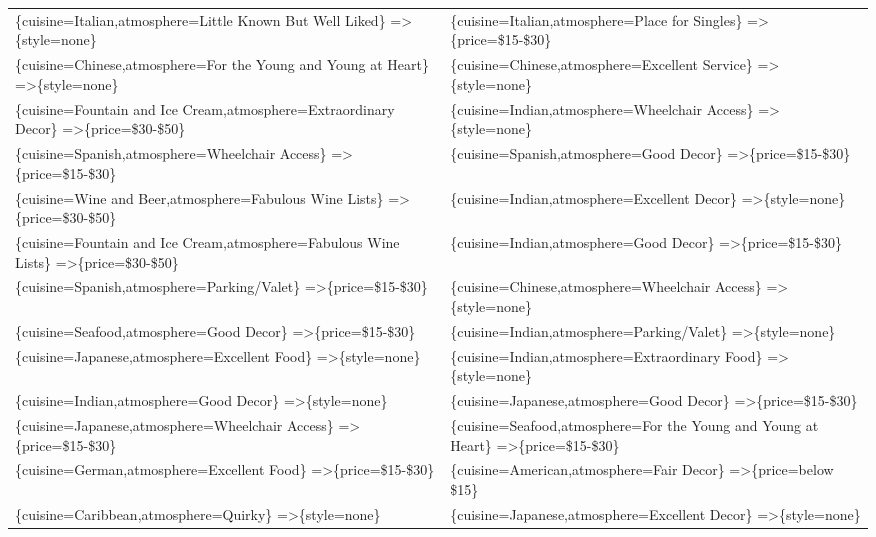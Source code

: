 \documentclass[letterpaper,10pt]{article}
\begin{document}
\begin{appendices}
\begin{table}[h]
\begin{adjustbox}{max width=\textwidth}
\begin{tabular}{ll}
\{cuisine=Italian,atmosphere=Little Known But Well Liked\} =\textgreater \{style=none\} & \{cuisine=Italian,atmosphere=Place for Singles\} =\textgreater \{price=\$15-\$30\} \\
\{cuisine=Chinese,atmosphere=For the Young and Young at Heart\} =\textgreater \{style=none\} & \{cuisine=Chinese,atmosphere=Excellent Service\} =\textgreater \{style=none\} \\
\{cuisine=Fountain and Ice Cream,atmosphere=Extraordinary Decor\} =\textgreater \{price=\$30-\$50\} & \{cuisine=Indian,atmosphere=Wheelchair Access\} =\textgreater \{style=none\} \\
\{cuisine=Spanish,atmosphere=Wheelchair Access\} =\textgreater \{price=\$15-\$30\} & \{cuisine=Spanish,atmosphere=Good Decor\} =\textgreater \{price=\$15-\$30\} \\
\{cuisine=Wine and Beer,atmosphere=Fabulous Wine Lists\} =\textgreater \{price=\$30-\$50\} & \{cuisine=Indian,atmosphere=Excellent Decor\} =\textgreater \{style=none\} \\
\{cuisine=Fountain and Ice Cream,atmosphere=Fabulous Wine Lists\} =\textgreater \{price=\$30-\$50\} & \{cuisine=Indian,atmosphere=Good Decor\} =\textgreater \{price=\$15-\$30\} \\
\{cuisine=Spanish,atmosphere=Parking/Valet\} =\textgreater \{price=\$15-\$30\} & \{cuisine=Chinese,atmosphere=Wheelchair Access\} =\textgreater \{style=none\} \\
\{cuisine=Seafood,atmosphere=Good Decor\} =\textgreater \{price=\$15-\$30\} & \{cuisine=Indian,atmosphere=Parking/Valet\} =\textgreater \{style=none\} \\
\{cuisine=Japanese,atmosphere=Excellent Food\} =\textgreater \{style=none\} & \{cuisine=Indian,atmosphere=Extraordinary Food\} =\textgreater \{style=none\} \\
\{cuisine=Indian,atmosphere=Good Decor\} =\textgreater \{style=none\} & \{cuisine=Japanese,atmosphere=Good Decor\} =\textgreater \{price=\$15-\$30\} \\
\{cuisine=Japanese,atmosphere=Wheelchair Access\} =\textgreater \{price=\$15-\$30\} & \{cuisine=Seafood,atmosphere=For the Young and Young at Heart\} =\textgreater \{price=\$15-\$30\} \\
\{cuisine=German,atmosphere=Excellent Food\} =\textgreater \{price=\$15-\$30\} & \{cuisine=American,atmosphere=Fair Decor\} =\textgreater \{price=below \$15\} \\
\{cuisine=Caribbean,atmosphere=Quirky\} =\textgreater \{style=none\} & \{cuisine=Japanese,atmosphere=Excellent Decor\} =\textgreater \{style=none\} \\

\end{tabular}
\end{adjustbox}
\end{table}
\end{appendices}
\end{document}

